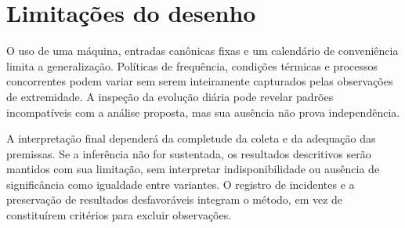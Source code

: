 \section{Limitações do desenho}

O uso de uma máquina, entradas canônicas fixas e um calendário de conveniência limita a generalização. Políticas de frequência, condições térmicas e processos concorrentes podem variar sem serem inteiramente capturados pelas observações de extremidade. A inspeção da evolução diária pode revelar padrões incompatíveis com a análise proposta, mas sua ausência não prova independência.

A interpretação final dependerá da completude da coleta e da adequação das premissas. Se a inferência não for sustentada, os resultados descritivos serão mantidos com sua limitação, sem interpretar indisponibilidade ou ausência de significância como igualdade entre variantes. O registro de incidentes e a preservação de resultados desfavoráveis integram o método, em vez de constituírem critérios para excluir observações.
